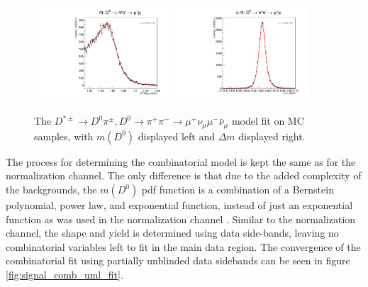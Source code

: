 \begin{figure}[htp]
    \begin{center}
      \includegraphics[width=0.45\textwidth]{figures/chapter4/signal_fit/d0pipimm_2022_2023_0_m.pdf}
      \includegraphics[width=0.45\textwidth]{figures/chapter4/signal_fit/d0pipimm_2022_2023_0_dm.pdf}\\
    \end{center}
    \caption{
      The $D^{*\pm} \to D^0\pi^\pm, D^0 \to \pi^+ \pi^- \to \mu^+ \nu_\mu \mu^- \bar{\nu}_\mu$ model fit on MC samples, with $m(D^0)$ displayed left and $\Delta m$ displayed right.
    }
    \label{fig:d0munumunu_uml_fit}
\end{figure}


The process for determining the combinatorial model is kept the same as for the normalization channel. The only difference is that due to the added complexity of the backgrounds, the $m(D^0)$ pdf function is a combination of a Bernstein polynomial, power law, and exponential function, instead of just an exponential function as was used in the normalization channel \cite{ref:dauncey_2015}. Similar to the normalization channel, the shape and yield is determined using data side-bands, leaving no combinatorial variables left to fit in the main data region. The convergence of the combinatorial fit using partially unblinded data sidebands can be seen in figure \ref{fig:signal_comb_uml_fit}.

